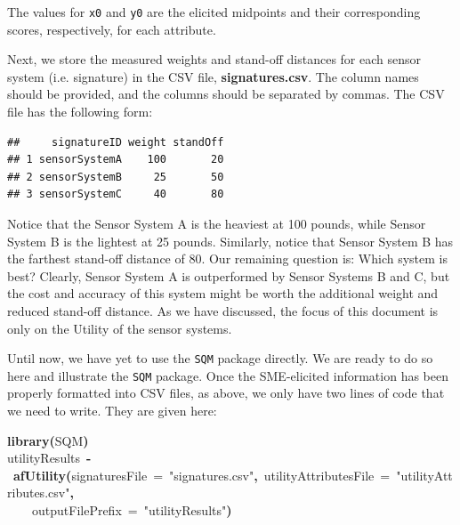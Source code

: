 \documentclass{article}
\makeatletter
\newcommand{\hlfunctioncall}[1]{\textcolor[rgb]{.5,0,.33}{\textbf{#1}}}%
\newcommand{\hlstring}[1]{\textcolor[rgb]{.6,.6,1}{#1}}%
\newcommand{\hlkeyword}[1]{\textbf{#1}}%
\newcommand{\hlargument}[1]{\textcolor[rgb]{.69,.25,.02}{#1}}%
\newcommand{\hlassignement}[1]{\textbf{#1}}%
\newcommand{\hlsymbol}[1]{#1}%
\newcommand{\hlstd}[1]{\textcolor[rgb]{0,0,0}{#1}}%
\newenvironment{kframe}{%
 \def\FrameCommand##1{\hskip\@totalleftmargin \hskip-\fboxsep
 \colorbox{shadecolor}{##1}\hskip-\fboxsep
     \hskip-\linewidth \hskip-\@totalleftmargin \hskip\columnwidth}%
 \MakeFramed {\advance\hsize-\width
   \@totalleftmargin\z@ \linewidth\hsize
   \@setminipage}}%
 {\par\unskip\endMakeFramed}
\newenvironment{knitrout}{}{} %
\makeatother
\begin{document}
The values for {\tt x0} and {\tt y0} are the elicited midpoints and their corresponding scores, respectively, for
each attribute.

Next, we store the measured weights and stand-off distances for each sensor system (i.e. signature) in the CSV file,
\textbf{signatures.csv}.
The column names should be provided, and the columns should be separated by commas. The CSV file has
the following form:

\begin{knitrout}
\color{fgcolor}\begin{kframe}
\begin{verbatim}
##     signatureID weight standOff
## 1 sensorSystemA    100       20
## 2 sensorSystemB     25       50
## 3 sensorSystemC     40       80
\end{verbatim}
\end{kframe}
\end{knitrout}


Notice that the Sensor System A is the heaviest at 100 pounds, while Sensor System B is the lightest
at 25 pounds. Similarly, notice that Sensor System B has the farthest stand-off distance of
80. Our remaining question is: Which system is best? Clearly, Sensor System A is outperformed by
Sensor Systems B and C, but the cost and accuracy of this system might be worth the additional weight and reduced
stand-off distance. As we have discussed, the focus of this document is only on the Utility of the sensor systems.

Until now, we have yet to use the {\tt SQM} package directly. We are ready to do so here and illustrate the {\tt SQM}
package. Once the SME-elicited information has been properly formatted into CSV files, as above, we only have two
lines of code that we need to write. They are given here:
\begin{knitrout}
\color{fgcolor}\begin{kframe}
\begin{flushleft}
\ttfamily\noindent
\hlfunctioncall{library}\hlkeyword{(}\hlsymbol{SQM}\hlkeyword{)}\hspace*{\fill}\\
\hlstd{}\hlsymbol{utilityResults}{\ }\hlassignement{\usebox{\hlnormalsizeboxlessthan}-}{\ }\hlfunctioncall{afUtility}\hlkeyword{(}\hlargument{signaturesFile}{\ }\hlargument{=}{\ }\hlstring{"{}signatures.csv"{}}\hlkeyword{,}{\ }\hlargument{utilityAttributesFile}{\ }\hlargument{=}{\ }\hlstring{"{}utilityAttributes.csv"{}}\hlkeyword{,}\hspace*{\fill}\\
\hlstd{}{\ }{\ }{\ }{\ }\hlargument{outputFilePrefix}{\ }\hlargument{=}{\ }\hlstring{"{}utilityResults"{}}\hlkeyword{)}\mbox{}
\normalfont
\end{flushleft}
\end{kframe}
\end{knitrout}
\end{document}
